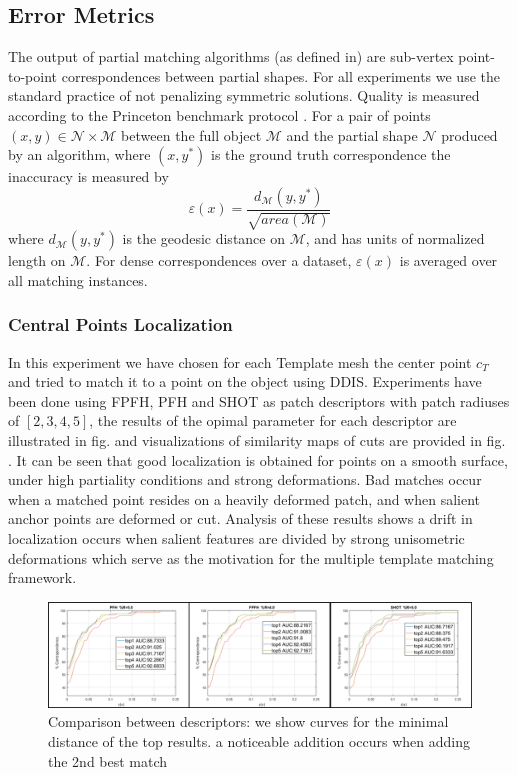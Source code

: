 \documentclass[10pt,twocolumn,letterpaper]{article}
\begin{document}
\subsection{Error Metrics}
The output of partial matching algorithms (as defined in\cite{cosmo2016shrec}) are sub-vertex point-to-point correspondences between partial shapes.
For all experiments we use the standard practice of not penalizing symmetric solutions. Quality is measured according to the Princeton benchmark protocol \cite{kim2011blended}. For a pair of points $(x,y)\in \mathcal{N}\times \mathcal{M}$ between the full object $\mathcal{M}$ and the partial shape $\mathcal{N}$ produced by an algorithm, where $(x,y^*)$ is the ground truth correspondence the inaccuracy is measured by 
\begin{equation}
\varepsilon(x)=\frac{d_{\mathcal{M}}(y,y^*)}{\sqrt{area(\mathcal{M})}}
\end{equation}
where $d_{\mathcal{M}}(y,y^*)$ is the geodesic distance on $\mathcal{M}$, and has units of normalized length on $\mathcal{M}$. For dense correspondences over a dataset, $\varepsilon(x)$ is averaged over all matching instances.
\subsubsection{Central Points Localization}
In this experiment we have chosen for each Template mesh the center point $c_T$ and tried to match it to a point on the object using DDIS. Experiments have been done using FPFH, PFH and SHOT as patch descriptors with patch radiuses of $[2,3,4,5]$, the results of the opimal parameter for each descriptor are illustrated in fig. and visualizations of similarity maps of cuts are provided in fig. . It can be seen that good localization is obtained for points on a smooth surface, under high partiality conditions and strong deformations. Bad matches occur when a matched point resides on a heavily deformed patch, and when salient anchor points are deformed or cut.  Analysis of these results shows a drift in localization occurs when salient features are divided by strong unisometric deformations which serve as the motivation for the multiple template matching framework.

\begin{figure}[htb]
	\centering

	\includegraphics[width=1\textwidth]{figures/ROCfigure.png}
	\caption{Comparison between descriptors: we show curves for the minimal distance of the top results. a noticeable addition occurs when adding the 2nd best match}
\end{figure}
\end{document}

